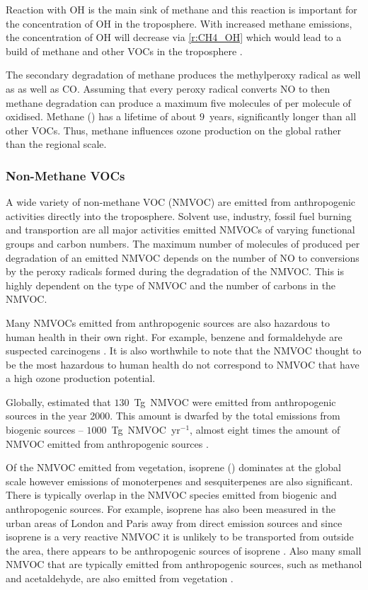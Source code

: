 Reaction with OH is the main sink of methane and this reaction is important for the concentration of OH in the troposphere.
With increased methane emissions, the concentration of OH will decrease via \eqref{r:CH4_OH} which would lead to a build of methane and other VOCs in the troposphere \citep{Holmes:2013}.

The secondary degradation of methane produces the methylperoxy radical  as well as  as well as CO.
Assuming that every peroxy radical converts NO to  then methane degradation can produce a maximum five molecules of  per molecule of  oxidised.
Methane () has a lifetime of about $9$~years, significantly longer than all other VOCs.
Thus, methane influences ozone production on the global rather than the regional scale.  

\subsubsection{Non-Methane VOCs}
A wide variety of non-methane VOC (NMVOC) are emitted from anthropogenic activities directly into the troposphere.
Solvent use, industry, fossil fuel burning and transportion are all major activities emitted NMVOCs of varying functional groups and carbon numbers.
The maximum number of molecules of  produced per degradation of an emitted NMVOC depends on the number of NO to  conversions by the peroxy radicals formed during the degradation of the NMVOC.
This is highly dependent on the type of NMVOC and the number of carbons in the NMVOC.

Many NMVOCs emitted from anthropogenic sources are also hazardous to human health in their own right.
For example, benzene and formaldehyde are suspected carcinogens \citep{Laurent:2014}.
It is also worthwhile to note that the NMVOC thought to be the most hazardous to human health do not correspond to NMVOC that have a high ozone production potential.

Globally, \citet{Lamarque:2010} estimated that $130$~Tg~NMVOC were emitted from anthropogenic sources in the year 2000.
This amount is dwarfed by the total emissions from biogenic sources -- $1000$~Tg~NMVOC~yr$^{-1}$, almost eight times the amount of NMVOC emitted from anthropogenic sources \citep{Guenther:2012}.

Of the NMVOC emitted from vegetation, isoprene () dominates at the global scale however emissions of monoterpenes and sesquiterpenes are also significant.
There is typically overlap in the NMVOC species emitted from biogenic and anthropogenic sources. 
For example, isoprene has also been measured in the urban areas of London and Paris away from direct emission sources and since isoprene is a very reactive NMVOC it is unlikely to be transported from outside the area, there appears to be anthropogenic sources of isoprene \citep{vonSchneidemesser:2011}.
Also many small NMVOC that are typically emitted from anthropogenic sources, such as methanol and acetaldehyde, are also emitted from vegetation \citep{Guenther:2012}.

